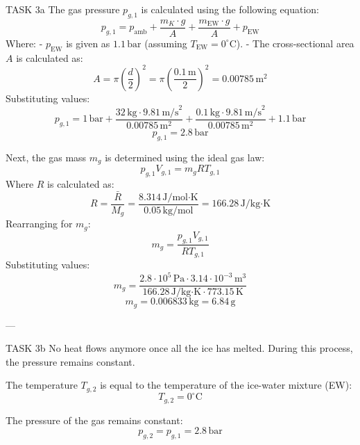 TASK 3a  
The gas pressure \( p_{g,1} \) is calculated using the following equation:  
\[
p_{g,1} = p_{\text{amb}} + \frac{m_K \cdot g}{A} + \frac{m_{\text{EW}} \cdot g}{A} + p_{\text{EW}}
\]  
Where:  
- \( p_{\text{EW}} \) is given as \( 1.1 \, \text{bar} \) (assuming \( T_{\text{EW}} = 0^\circ\text{C} \)).  
- The cross-sectional area \( A \) is calculated as:  
\[
A = \pi \left( \frac{d}{2} \right)^2 = \pi \left( \frac{0.1 \, \text{m}}{2} \right)^2 = 0.00785 \, \text{m}^2
\]  
Substituting values:  
\[
p_{g,1} = 1 \, \text{bar} + \frac{32 \, \text{kg} \cdot 9.81 \, \text{m/s}^2}{0.00785 \, \text{m}^2} + \frac{0.1 \, \text{kg} \cdot 9.81 \, \text{m/s}^2}{0.00785 \, \text{m}^2} + 1.1 \, \text{bar}
\]  
\[
p_{g,1} = 2.8 \, \text{bar}
\]  

Next, the gas mass \( m_g \) is determined using the ideal gas law:  
\[
p_{g,1} V_{g,1} = m_g R T_{g,1}
\]  
Where \( R \) is calculated as:  
\[
R = \frac{\bar{R}}{M_g} = \frac{8.314 \, \text{J/mol·K}}{0.05 \, \text{kg/mol}} = 166.28 \, \text{J/kg·K}
\]  
Rearranging for \( m_g \):  
\[
m_g = \frac{p_{g,1} V_{g,1}}{R T_{g,1}}
\]  
Substituting values:  
\[
m_g = \frac{2.8 \cdot 10^5 \, \text{Pa} \cdot 3.14 \cdot 10^{-3} \, \text{m}^3}{166.28 \, \text{J/kg·K} \cdot 773.15 \, \text{K}}
\]  
\[
m_g = 0.006833 \, \text{kg} = 6.84 \, \text{g}
\]  

---

TASK 3b  
No heat flows anymore once all the ice has melted. During this process, the pressure remains constant.  

The temperature \( T_{g,2} \) is equal to the temperature of the ice-water mixture (EW):  
\[
T_{g,2} = 0^\circ\text{C}
\]  

The pressure of the gas remains constant:  
\[
p_{g,2} = p_{g,1} = 2.8 \, \text{bar}
\]